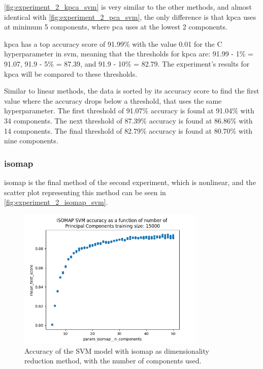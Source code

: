 \autoref{fig:experiment_2_kpca_svm} is very similar to the other methods, and almost identical with \autoref{fig:experiment_2_pca_svm}, the only difference is that \gls{kpca} uses at minimum 5 components, where \gls{pca} uses at the lowest 2 components.

\gls{kpca} has a top accuracy score of 91.99\% with the value 0.01 for the C hyperparameter in \gls{svm}, meaning that the thresholds for \gls{kpca} are: 91.99 - 1\% = 91.07, 91.9 - 5\% = 87.39, and 91.9 - 10\% = 82.79. The experiment's results for \gls{kpca} will be compared to these thresholds.

Similar to linear methods, the data is sorted by its accuracy score to find the first value where the accuracy drops below a threshold, that uses the same hyperparameter. The first threshold of 91.07\% accuracy is found at 91.04\% with 34 components. The next threshold of 87.39\% accuracy is found at 86.86\% with 14 components. The final threshold of 82.79\% accuracy is found at 80.70\% with nine components.


\subsubsection{\gls{isomap}}\label{subsubsec:experiment_2_isomap}
\gls{isomap} is the final method of the second experiment, which is nonlinear, and the scatter plot representing this method can be seen in \autoref{fig:experiment_2_isomap_svm}.

\begin{figure}[htb!]
    \centering
    \includegraphics[width=0.8\textwidth]{figures/experiment_two/isomap_rerun_svm_15000.png}
    \caption{Accuracy of the SVM model with \gls{isomap} as dimensionality reduction method, with the number of components used.}
    \label{fig:experiment_2_isomap_svm}
\end{figure}

